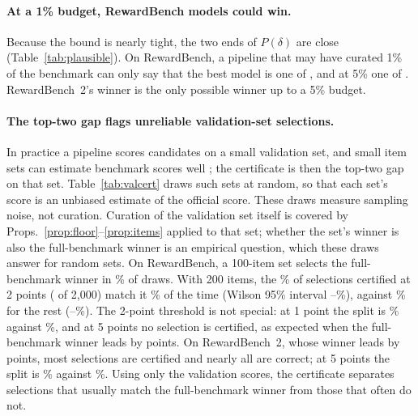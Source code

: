 \documentclass[11pt]{article}
\begin{document}
\paragraph{At a 1\% budget, \OnePlausOneLo{} RewardBench models could win.} Because the bound is nearly tight, the two ends of $P(\delta)$ are close (Table~\ref{tab:plausible}). On RewardBench, a pipeline that may have curated 1\% of the benchmark can only say that the best model is one of \OnePlausOneLo{}, and at 5\% one of \OnePlausFiveLo{}. RewardBench~2's winner is the only possible winner up to a 5\% budget.

\begin{table}[t]
\centering\small
\resizebox{\columnwidth}{!}{}
\caption{Selection on random validation sets of $n$ items, drawn with replacement in proportion to official weight (2{,}000 draws per $n$). Each entry is the \% of draws that select the full-benchmark winner: over all draws (all), over draws whose top-two gap on the set exceeds 2 points (cert.; \% of draws in brackets), and over the remaining draws (not). Certified selections are correct far more often than the rest.}
\label{tab:valcert}
\end{table}

\paragraph{The top-two gap flags unreliable validation-set selections.} In practice a pipeline scores candidates on a small validation set, and small item sets can estimate benchmark scores well \citep{polo2024tiny}; the certificate is then the top-two gap on that set. Table~\ref{tab:valcert} draws such sets at random, so that each set's score is an unbiased estimate of the official score. These draws measure sampling noise, not curation. Curation of the validation set itself is covered by Props.~\ref{prop:floor}--\ref{prop:items} applied to that set; whether the set's winner is also the full-benchmark winner is an empirical question, which these draws answer for random sets. On RewardBench, a 100-item set selects the full-benchmark winner in \OneValHundred\% of draws. With 200 items, the \OneValTwoHundredCertShare\% of selections certified at 2 points (\OneValTwoHundredCertCount{} of 2{,}000) match it \OneValTwoHundredCert\% of the time (Wilson 95\% interval \OneValTwoHundredCertLo--\OneValTwoHundredCertHi\%), against \OneValTwoHundredUncert\% for the rest (\OneValTwoHundredUncertLo--\OneValTwoHundredUncertHi\%). The 2-point threshold is not special: at 1 point the split is \OneValTwoHundredCertOne\% against \OneValTwoHundredUncertOne\%, and at 5 points no selection is certified, as expected when the full-benchmark winner leads by \OneCertGap{} points. On RewardBench~2, whose winner leads by \TwoCertGap{} points, most selections are certified and nearly all are correct; at 5 points the split is \TwoValTwoHundredCertFive\% against \TwoValTwoHundredUncertFive\%. Using only the validation scores, the certificate separates selections that usually match the full-benchmark winner from those that often do not.
\end{document}

